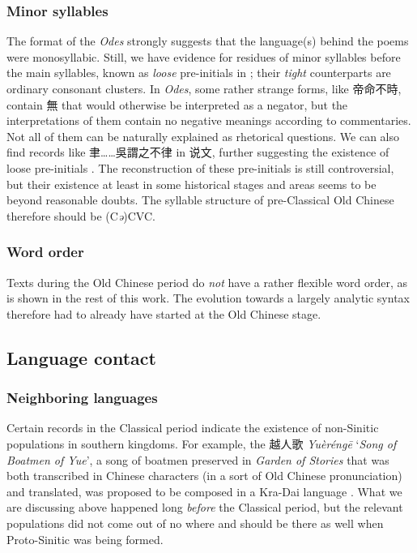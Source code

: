 \documentclass[UTF8, a4paper, oneside, scheme=plain, 12pt]{ctexrep}
\newcommand*{\citepages}[1]{pp.~{#1}}
\newcommand{\form}[1]{\emph{#1}}
\newcommand{\work}[1]{\textit{#1}}
\newcommand{\translate}[1]{`#1'}
\begin{document}
\subsubsection{Minor syllables}\label{sec:intro.reconstruction.minor-syllables}
The format of the \work{Odes} strongly suggests that
the language(s) behind the poems were monosyllabic.
Still, we have evidence for residues of minor syllables before the main syllables,
known as \emph{loose} pre-initials in \citet{baxter2014old};
their \emph{tight} counterparts are ordinary consonant clusters.
In \form{Odes}, some rather strange forms, like 帝命不時,
contain 無 that would otherwise be interpreted as a negator,
but the interpretations of them contain no negative meanings
according to commentaries.
Not all of them can be naturally explained as rhetorical questions.
We can also find records like 聿……吳謂之不律 in 说文,
further suggesting the existence of loose pre-initials
\citep[\citepages{122-1235}]{hill2019historical}.
The reconstruction of these pre-initials is still controversial,
but their existence at least in some historical stages and areas seems to be beyond reasonable doubts.
The syllable structure of pre-Classical Old Chinese therefore should be (C\form{ə})CVC.


\subsubsection{Word order}
Texts during the Old Chinese period do \emph{not} have a rather flexible word order, as is shown in the rest of this work.
The evolution towards a largely analytic syntax therefore had to already have started at the Old Chinese stage.





\subsection{Language contact}\label{sec:intro.pre-history.mixing}

\subsubsection{Neighboring languages}

Certain records in the Classical period indicate the existence of non-Sinitic populations in southern kingdoms.
For example, the 越人歌 \form{Yuèréngē} \translate{\work{Song of Boatmen of Yue}},
a song of boatmen preserved in \work{Garden of Stories} that was both transcribed in Chinese characters (in a sort of Old Chinese pronunciation) and translated,
was proposed to be composed in a Kra-Dai language \citep{zhengzhang1991decipherment}.
What we are discussing above happened long \emph{before} the Classical period,
but the relevant populations did not come out of no where
and should be there as well when Proto-Sinitic was being formed.
\end{document}
